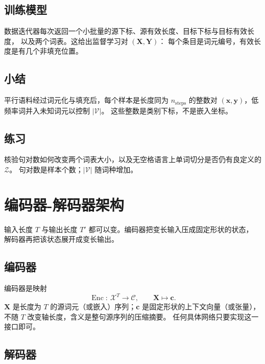 \subsection{训练模型}

数据迭代器每次返回一个小批量的源下标、源有效长度、目标下标与目标有效长度，
以及两个词表。这给出监督学习对 $(\bm{X},\bm{Y})$：
每个条目是词元编号，有效长度是有几个非填充位置。

\subsection{小结}

平行语料经过词元化与填充后，每个样本是长度同为 $n_{\text{steps}}$ 的整数对
$(\bm{x},\bm{y})$，低频率词并入未知词元以控制 $|\mathcal{V}|$。
这些整数是类别下标，不是嵌入坐标。

\subsection{练习}

核验句对数如何改变两个词表大小，以及无空格语言上单词切分是否仍有良定义的 $\mathcal{Z}$。
句对数是样本个数；$|\mathcal{V}|$ 随词种增加。

\section{编码器-解码器架构}



输入长度 $T$ 与输出长度 $T'$ 都可以变。编码器把变长输入压成固定形状的状态，
解码器再把该状态展开成变长输出。

\subsection{编码器}

编码器是映射
\[
\operatorname{Enc}:\ \mathcal{X}^{T}\to\mathcal{C},
\qquad
\bm{X}\mapsto\bm{c}.
\]
$\bm{X}$ 是长度为 $T$ 的源词元（或嵌入）序列；$\bm{c}$ 是固定形状的上下文向量（或张量），
不随 $T$ 改变轴长度，含义是整句源序列的压缩摘要。
任何具体网络只要实现这一接口即可。

\subsection{解码器}

